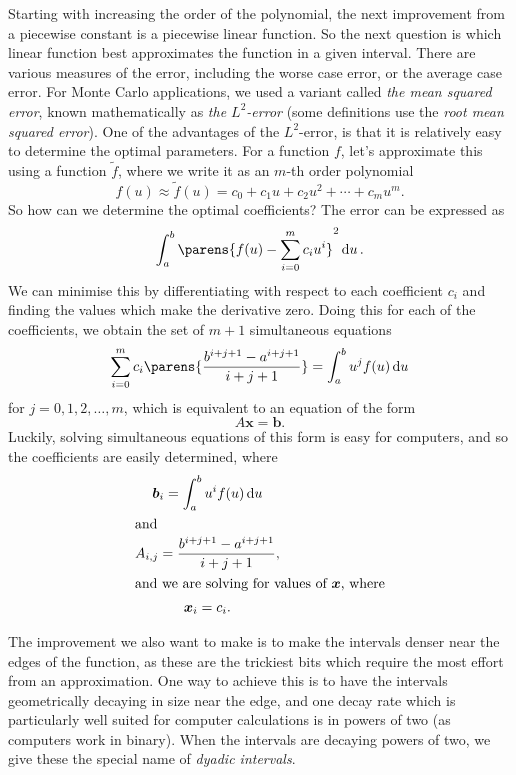 \documentclass[11pt,a4paper,twoside,english]{extarticle}
\begin{document}
Starting with increasing the order of the polynomial, the next improvement from a piecewise constant is a piecewise linear function. So the next question is which linear function best approximates the function in a given interval. There are various measures of the error, including the worse case error, or the average case error. For Monte Carlo applications, we used a variant called \emph{the mean squared error}, known mathematically as \emph{the $ L^2 $-error} (some definitions use the \emph{root mean squared error}). One of the advantages of the $ L^2 $-error, is that it is relatively easy to determine the optimal parameters. For a function $ f $, let's approximate this using a function $ \tilde{f} $, where we write it as an $ m $-th order polynomial  
\begin{equation}
f(u) \approx \tilde{f}(u) = c_0 + c_1 u + c_2 u^2 + \cdots + c_m u^m. 
\end{equation}
So how can we determine the optimal coefficients? The error can be expressed as 
\begin{equation}
\int_{a}^{b} \parens{f(u) - \sum_{i=0}^{m}c_i u^i}^2 \dd{u}.
\end{equation}
We can minimise this by differentiating with respect to each coefficient $ c_i $ and finding the values which make the derivative zero. Doing this for each of the coefficients, we obtain the set of $ m + 1 $ simultaneous equations 
\begin{equation}
\sum_{i=0}^{m} c_i \parens{\dfrac{b^{i+j+1} - a^{i + j + 1}}{i + j + 1}} = \int_{a}^{b} u^j f(u) \dd{u}
\end{equation}
for $ j = 0,1,2,\ldots,m $, which is equivalent to an equation of the form 
\begin{equation}
A\bm{x} = \bm{b}.
\end{equation} 
Luckily, solving simultaneous equations of this form is easy for computers, and so the coefficients are easily determined, where 
\begin{gather}
\bm{b}_i = \int_{a}^{b} u^i f(u) \dd{u} \\
\shortintertext{and}
A_{i,j} = \dfrac{b^{i+j+1} - a^{i + j + 1}}{i + j + 1}, \\
\shortintertext{and we are solving for values of $ \bm{x} $, where}
\bm{x}_i = c_i.
\end{gather}

The improvement we also want to make is to make the intervals denser near the edges of the function, as these are the trickiest bits which require the most effort from an approximation. One way to achieve this is to have the intervals geometrically decaying in size near the edge, and one decay rate which is particularly well suited for computer calculations is in powers of two (as computers work in binary). When the intervals are decaying powers of two, we give these the special name of \emph{dyadic intervals}.
\end{document}
